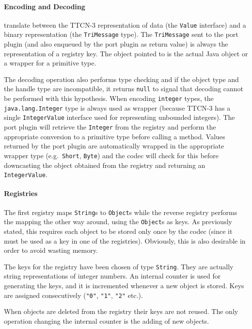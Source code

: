 \paragraph{Encoding and Decoding}
translate between the \ac{TTCN-3} representation of data
(the \verb=Value= interface)
and a binary representation (the \verb=TriMessage= type).
The \verb=TriMessage= sent to the port plugin
(and also enqueued by the port plugin as return value)
is always the representation of a registry key.
The object pointed to is the actual Java object
or a wrapper for a primitive type.

The decoding operation also performs type checking
and if the object type and the handle type are incompatible,
it returns \verb=null=
to signal that decoding cannot be performed with this hypothesis.
When encoding \verb=integer= types, the \verb=java.lang.Integer= type
is always used as wrapper
(because \ac{TTCN-3} has a single \verb=IntegerValue= interface
used for representing unbounded  integers).
The port plugin will retrieve the \verb=Integer= from the registry
and perform the appropriate conversion to a primitive type
before calling a method.
Values returned by the port plugin are automatically wrapped
in the appropriate wrapper type (e.g.\ \verb=Short=, \verb=Byte=)
and the codec will check for this before downcasting
the object obtained from the registry and returning an \verb=IntegerValue=.

\paragraph{Registries}
The first registry maps \verb=String=s to \verb=Object=s
while the reverse registry performs the mapping the other way around,
using the \verb=Object=s as keys.
As previously stated, this requires each object to be stored only once
by the codec (since it must be used as a key in one of the registries).
Obviously, this is also desirable in order to avoid wasting memory.

The keys for the registry have been chosen of type \verb=String=.
They are actually string representations of integer numbers.
An internal counter is used for generating the keys,
and it is incremented whenever a new object is stored.
Keys are assigned consecutively (\verb="0"=, \verb="1"=, \verb="2"= etc.).

When objects are deleted from the registry their keys are not reused.
The only operation changing the internal counter is the adding of new objects.


